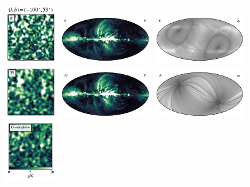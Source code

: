 \documentclass[twocolumn]{../../common/aa}
\begin{document}
\begin{figure}
	\centering
	\includegraphics[width=0.2\textwidth]{figures/K_square.pdf}
	\includegraphics[width=0.35\textwidth]{figures/Kband_polint.pdf}
	\includegraphics[width=0.35\textwidth]{figures/Kband_sigmaP.pdf}\\
	\includegraphics[width=0.2\textwidth]{figures/30_square.pdf}
	\includegraphics[width=0.35\textwidth]{figures/30GHz_polint.pdf}
	\includegraphics[width=0.35\textwidth]{figures/30GHz_sigmaP.pdf}\\
	\includegraphics[width=0.2\textwidth]{figures/CG_square.pdf}

\end{figure}
\end{document}
